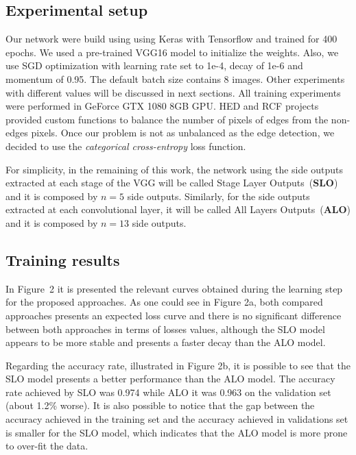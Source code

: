 \subsection{Experimental setup}
   
Our network were build using using Keras \cite{chollet2015keras} with Tensorflow \cite{tensorflow2015-whitepaper} and trained for 400 epochs. We used a pre-trained VGG16 model to initialize the weights. Also, we use SGD optimization with learning rate set to 1e-4, decay of 1e-6 and momentum of 0.95. The default batch size contains 8 images. Other experiments with different values will be discussed in next sections. All training experiments were performed in GeForce GTX 1080 8GB GPU. HED and RCF projects provided custom functions to balance the number of pixels of edges from the non-edges pixels. Once our problem is not as unbalanced as the edge detection, we decided to use the  \textit{{categorical} {cross-entropy}} loss function.


For simplicity, in the remaining of this work, the network using the side outputs extracted at each stage of the VGG will be called Stage Layer Outputs~(\textbf{SLO}) and it is composed by $n=5$ side outputs. Similarly, for the side outputs extracted at each convolutional layer, it will be called All Layers Outputs~(\textbf{ALO}) and it is composed by $n=13$ side outputs. 

\subsection{Training results}

In Figure~2 it is presented the relevant curves obtained during the learning step for the proposed approaches. As one could see in Figure 2a, both compared approaches presents an expected loss curve and there is no significant difference between both approaches in terms of losses values, although the SLO model appears to be more stable and presents a faster decay than the ALO model.

Regarding the accuracy rate, illustrated in Figure 2b, it is possible to see that the SLO model presents a better performance than the ALO model. The accuracy rate achieved by SLO was 0.974 while ALO it was 0.963 on the validation set (about 1.2\% worse). It is also possible to notice that the gap between the accuracy achieved in the training set and the accuracy achieved in validations set is smaller for the SLO model, which indicates that the ALO model is more prone to over-fit the data. 

